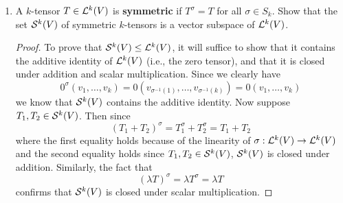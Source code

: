 \documentclass[../psets.tex]{subfiles}
\begin{document}
\begin{enumerate}[label={\textbf{1.5.\roman*.}}]
    \item A $k$-tensor $T\in\lin[k]{V}$ is \textbf{symmetric} if $T^\sigma=T$ for all $\sigma\in S_k$. Show that the set $\sym[k]{V}$ of symmetric $k$-tensors is a vector subspace of $\lin[k]{V}$.
    \begin{proof}
        To prove that $\sym[k]{V}\leq\lin[k]{V}$, it will suffice to show that it contains the additive identity of $\lin[k]{V}$ (i.e., the zero tensor), and that it is closed under addition and scalar multiplication. Since we clearly have
        \begin{equation*}
            0^\sigma(v_1,\dots,v_k) = 0(v_{\sigma^{-1}(1)},\dots,v_{\sigma^{-1}(k)})
            = 0(v_1,\dots,v_k)
        \end{equation*}
        we know that $\sym[k]{V}$ contains the additive identity. Now suppose $T_1,T_2\in\sym[k]{V}$. Then since
        \begin{equation*}
            (T_1+T_2)^\sigma = T_1^\sigma+T_2^\sigma
            = T_1+T_2
        \end{equation*}
        where the first equality holds because of the linearity of $\sigma:\lin[k]{V}\to\lin[k]{V}$ and the second equality holds since $T_1,T_2\in\sym[k]{V}$, $\sym[k]{V}$ is closed under addition. Similarly, the fact that
        \begin{equation*}
            (\lambda T)^\sigma = \lambda T^\sigma
            = \lambda T
        \end{equation*}
        confirms that $\sym[k]{V}$ is closed under scalar multiplication.
    \end{proof}
\end{enumerate}
\end{document}
